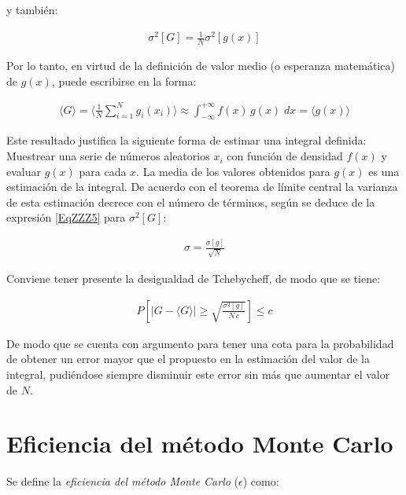 y tambi\'en:

\begin{eqnarray}
 	\sigma ^{2} [G] = \frac{1}{N} \sigma ^{2} [g(x)]
 \label{EqZZZ5}
\end{eqnarray}


Por lo tanto, en virtud de la definici\'on de valor medio (o esperanza matem\'atica) de $g(x)$,  puede escribirse en la forma:

\begin{eqnarray}
 	\langle G \rangle = \langle \frac{1}{N} \sum_{i=1}^{N} g_{i}(x_{i}) \rangle \approx \int _{-\infty} ^{+ \infty} f(x) \, g(x) \; dx =
 	\langle g(x) \rangle
 \label{EqZZZ6}
\end{eqnarray}

Este resultado justifica la siguiente forma de estimar una integral definida: Muestrear una serie de n\'umeros aleatorios $x_{i}$ con
funci\'on de densidad $f(x)$ y evaluar $g(x)$ para cada $x$. La media de los valores obtenidos para $g(x)$ es una estimaci\'on de la
integral. De acuerdo con el teorema de l\'imite central la varianza de esta estimaci\'on decrece con el n\'umero de t\'erminos, seg\'un se
deduce de la expresi\'on \ref{EqZZZ5} para $\sigma ^{2} [G]$:

\begin{eqnarray}
 	\sigma = \frac{\sigma [g]}{\sqrt{N}}
 \label{EqZZZ7}
\end{eqnarray}


Conviene tener presente la desigualdad de Tchebycheff, de modo que se tiene:

\begin{eqnarray}
 	P \left[ \lvert G - \langle G \rangle \rvert \ge \sqrt{\frac{\sigma ^{2} [g]}{N \, c}} \right] \le c
 \label{EqZZZ8}
\end{eqnarray}

De modo que se cuenta con argumento para tener una cota para la probabilidad de obtener un error mayor que el propuesto en la estimaci\'on
del valor de la integral, pudi\'endose siempre disminuir este error sin m\'as que aumentar el valor de $N$.

\section{Eficiencia del m\'etodo Monte Carlo}
\label{CapVII_2}

Se define la \textit{eficiencia del m\'etodo Monte Carlo} ($\epsilon$) como:

